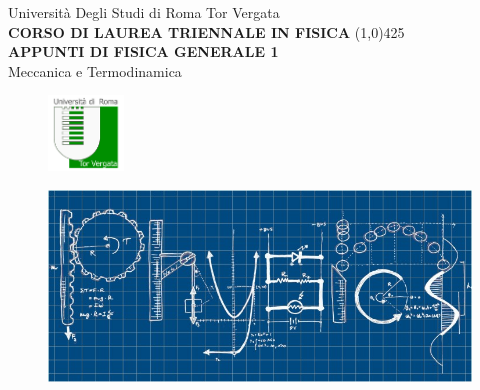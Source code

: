\begin{titlepage}
\begin{center}
\vspace*{10mm}
{ \fontsize{8mm}{6mm}\selectfont Università Degli Studi di Roma Tor Vergata}\\
\vspace{5mm}
{\fontsize{8mm}{6mm}}{\bfseries CORSO DI LAUREA TRIENNALE IN FISICA}
\line(1,0){425}\\

\vspace{2mm}
\huge{\bfseries{APPUNTI DI FISICA GENERALE 1}}\\
\huge{{Meccanica e Termodinamica}}\\
\end{center}
\begin{figure}[h]
\begin{center}
\includegraphics[width=2cm]{images/logo.png}
\label{default}
\end{center}
\end{figure}
\begin{figure}[h]
\begin{center}
\includegraphics[width=15cm]{images/copertina.jpg}  %
\label{default}
\end{center}
\end{figure}

\end{titlepage}

